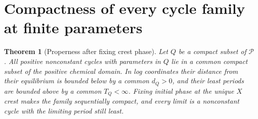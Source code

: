 \documentclass[11pt,a4paper]{article}
\numberwithin{equation}{section}
\newtheorem{theorem}{Theorem}[section]
\theoremstyle{remark}\newtheorem{remark}[theorem]{Remark}
\newcommand{\cP}{\mathcal P}
\begin{document}
\section{Compactness of every cycle family at finite parameters}\label{sec:compact}
\begin{theorem}[Properness after fixing crest phase]\label{thm:compact}
Let $Q$ be a compact subset of $\cP$. All positive nonconstant cycles with parameters in $Q$ lie in a common compact subset of the positive chemical domain. In log coordinates their distance from their equilibrium is bounded below by a common $d_Q>0$, and their least periods are bounded above by a common $T_Q<\infty$. Fixing initial phase at the unique $X$ crest makes the family sequentially compact, and every limit is a nonconstant cycle with the limiting period still least.
\end{theorem}
\end{document}
